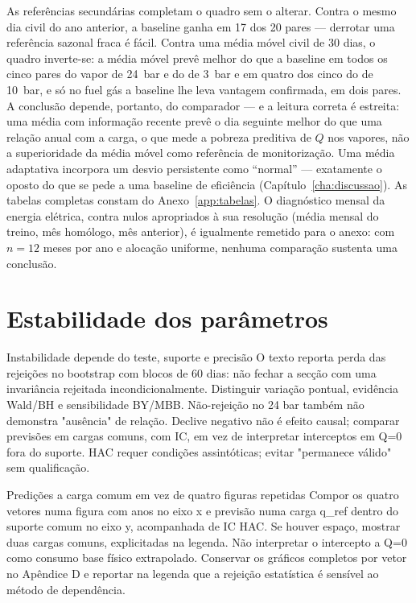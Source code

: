 As referências secundárias completam o quadro sem o alterar. Contra o mesmo
dia civil do ano anterior, a baseline ganha em 17 dos 20 pares --- derrotar
uma referência sazonal fraca é fácil. Contra uma média móvel civil de 30
dias, o quadro inverte-se: a média móvel prevê melhor do que a baseline em
todos os cinco pares do vapor de 24~bar e do de 3~bar e em quatro dos cinco
do de 10~bar, e só no fuel gás a baseline lhe leva vantagem confirmada, em
dois pares. A conclusão depende, portanto, do comparador --- e a leitura
correta é estreita: uma média com informação recente prevê o dia seguinte
melhor do que uma relação anual com a carga, o que mede a pobreza preditiva
de $Q$ nos vapores, não a superioridade da média móvel como referência de
monitorização. Uma média adaptativa incorpora um desvio persistente como
``normal'' --- exatamente o oposto do que se pede a uma baseline de eficiência
(Capítulo~\ref{cha:discussao}). As tabelas completas constam do
Anexo~\ref{app:tabelas}. O diagnóstico mensal da energia elétrica, contra
nulos apropriados à sua resolução (média mensal do treino, mês homólogo, mês
anterior), é igualmente remetido para o anexo: com $n{=}12$ meses por ano e
alocação uniforme, nenhuma comparação sustenta uma conclusão.

\section{Estabilidade dos parâmetros}
\label{sec:estabilidade}
{Instabilidade depende do teste, suporte e precisão}
{O texto reporta perda das rejeições no bootstrap com blocos de 60 dias:
não fechar a secção com uma invariância rejeitada incondicionalmente.
Distinguir variação pontual, evidência Wald/BH e sensibilidade BY/MBB.
Não-rejeição no 24 bar também não demonstra "ausência" de relação.
Declive negativo não é efeito causal; comparar previsões em cargas
comuns, com IC, em vez de interpretar interceptos em Q=0 fora do suporte.
HAC requer condições assintóticas; evitar "permanece válido" sem qualificação.}%

{Predições a carga comum em vez de quatro figuras repetidas}
{Compor os quatro vetores numa figura com anos no eixo x e previsão
numa carga q\_ref dentro do suporte comum no eixo y, acompanhada de IC HAC.
Se houver espaço, mostrar duas cargas comuns, explicitadas na legenda.
Não interpretar o intercepto a Q=0 como consumo base físico extrapolado.
Conservar os gráficos completos por vetor no Apêndice D e reportar na
legenda que a rejeição estatística é sensível ao método de dependência.}%

